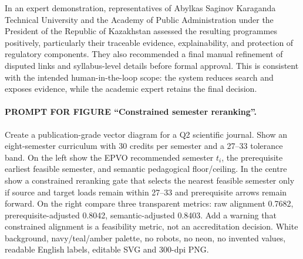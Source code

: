 \documentclass[twoside,11pt]{article}
\begin{document}
In an expert demonstration, representatives of Abylkas Saginov Karaganda Technical University and the Academy of Public Administration under the President of the Republic of Kazakhstan assessed the resulting programmes positively, particularly their traceable evidence, explainability, and protection of regulatory components. They also recommended a final manual refinement of disputed links and syllabus-level details before formal approval. This is consistent with the intended human-in-the-loop scope: the system reduces search and exposes evidence, while the academic expert retains the final decision.

\paragraph{PROMPT FOR FIGURE ``Constrained semester reranking''.}
Create a publication-grade vector diagram for a Q2 scientific journal. Show an eight-semester curriculum with 30 credits per semester and a 27--33 tolerance band. On the left show the EPVO recommended semester $t_i$, the prerequisite earliest feasible semester, and semantic pedagogical floor/ceiling. In the centre show a constrained reranking gate that selects the nearest feasible semester only if source and target loads remain within 27--33 and prerequisite arrows remain forward. On the right compare three transparent metrics: raw alignment 0.7682, prerequisite-adjusted 0.8042, semantic-adjusted 0.8403. Add a warning that constrained alignment is a feasibility metric, not an accreditation decision. White background, navy/teal/amber palette, no robots, no neon, no invented values, readable English labels, editable SVG and 300-dpi PNG.

\appendix
\end{document}
